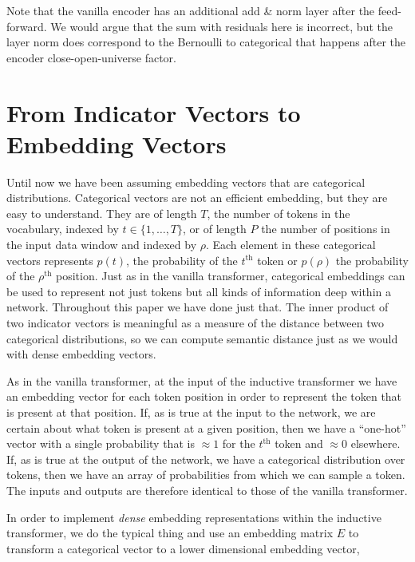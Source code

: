 \documentclass{article}
\begin{document}
Note that the vanilla encoder has an additional add \& norm layer after the feed-forward.  We would argue that the sum with residuals here is incorrect, but the layer norm does correspond to the Bernoulli to categorical that happens after the encoder close-open-universe factor. 


\section{From Indicator Vectors to Embedding Vectors}\label{appendix:from-indicator-to-embedding}

Until now we have been assuming embedding vectors that are categorical distributions.  Categorical vectors are not an efficient embedding, but they are easy to understand.  They are of length $T$, the number of tokens in the vocabulary, indexed by $t \in \{1, \ldots, T\}$, or of length $P$ the number of positions in the input data window and indexed by $\rho$.  Each element in these categorical vectors represents $p(t)$, the probability of the $t^\mathrm{th}$ token or $p(\rho)$ the probability of the $\rho^\mathrm{th}$ position.  Just as in the vanilla transformer, categorical embeddings can be used to represent not just tokens but all kinds of information deep within a network.  Throughout this paper we have done just that.  The inner product of two indicator vectors is meaningful as a measure of the distance between two categorical distributions, so we can compute semantic distance just as we would with dense embedding vectors.

As in the vanilla transformer, at the input of the inductive transformer we have an embedding vector for each token position in order to represent the token that is present at that position.  If, as is true at the input to the network, we are certain about what token is present at a given position, then we have a ``one-hot'' vector with a single probability that is $\approx 1$ for the $t^\text{th}$ token and $\approx 0$ elsewhere.  If, as is true at the output of the network, we have a categorical distribution over tokens, then we have an array of probabilities from which we can sample a token.  The inputs and outputs are therefore identical to those of the vanilla transformer.

In order to implement \emph{dense} embedding representations within the inductive transformer, we do the typical thing and use an embedding matrix $E$ to transform a categorical vector to a lower dimensional embedding vector,
\end{document}
